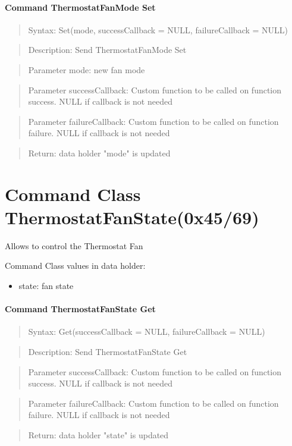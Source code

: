 \paragraph {Command ThermostatFanMode Set}
\begin{quote} Syntax: Set(mode, successCallback = NULL, failureCallback = NULL)\end{quote}
\begin{quote} Description: Send ThermostatFanMode Set\end{quote}
\begin{quote} Parameter mode: new fan mode\end{quote}
\begin{quote} Parameter successCallback: Custom function to be called on function success. NULL if callback is not needed\end{quote}
\begin{quote} Parameter failureCallback: Custom function to be called on function failure. NULL if callback is not needed\end{quote}
\begin{quote} Return: data holder "mode" is updated\end{quote}

\section{Command Class ThermostatFanState(0x45/69)}

Allows to control the Thermostat Fan

Command Class values in data holder:
\begin{itemize}
\item state: fan state
\end{itemize}

\paragraph {Command ThermostatFanState Get}
\begin{quote} Syntax: Get(successCallback = NULL, failureCallback = NULL)\end{quote}
\begin{quote} Description: Send ThermostatFanState Get\end{quote}
\begin{quote} Parameter successCallback: Custom function to be called on function success. NULL if callback is not needed\end{quote}
\begin{quote} Parameter failureCallback: Custom function to be called on function failure. NULL if callback is not needed\end{quote}
\begin{quote} Return: data holder "state" is updated\end{quote}

